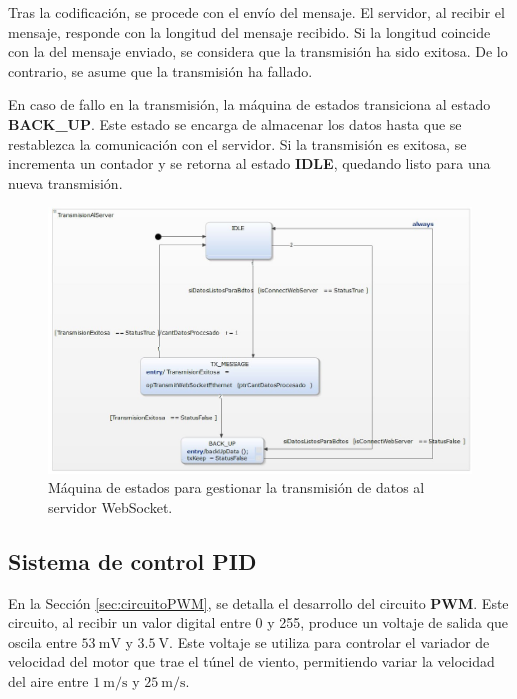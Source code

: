 Tras la codificación, se procede con el envío del mensaje. El servidor, al recibir el mensaje, responde con la longitud del mensaje recibido. Si la longitud coincide con la del mensaje enviado, se considera que la transmisión ha sido exitosa. De lo contrario, se asume que la transmisión ha fallado.

En caso de fallo en la transmisión, la máquina de estados transiciona al estado \textbf{BACK\_UP}. Este estado se encarga de almacenar los datos hasta que se restablezca la comunicación con el servidor. Si la transmisión es exitosa, se incrementa un contador y se retorna al estado \textbf{IDLE}, quedando listo para una nueva transmisión.


\begin{figure}[H]
    \centering
    \includegraphics[width=0.9\linewidth]{Figuras/datalogger/Firmware/transmisionServer.jpg}
    \caption{Máquina de estados para gestionar la transmisión de datos al servidor WebSocket.}
    \label{fig:transmisionServer}
\end{figure}


\subsection{Sistema de control PID}\label{sec:sistemaDeControlPid}

En la Sección \ref{sec:circuitoPWM}, se detalla el desarrollo del circuito \textbf{PWM}. Este circuito, al recibir un valor digital entre 0 y 255, produce un voltaje de salida que oscila entre $\SI{53}{\milli\volt}$ y $\SI{3.5}{\volt}$. Este voltaje se utiliza para controlar el variador de velocidad del motor que trae el túnel de viento, permitiendo variar la velocidad del aire entre $\SI{1}{\meter\per\second}$ y $\SI{25}{\meter\per\second}$.

